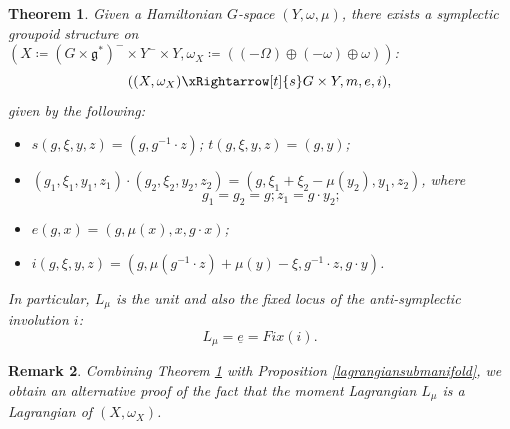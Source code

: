 \documentclass{amsart}
\newtheorem{theorem}{Theorem}[section]
\newtheorem{remark}[theorem]{Remark}
\numberwithin{equation}{section}
\begin{document}
\begin{theorem}\label{twisted-groupoid}
    Given a Hamiltonian $G$-space $(Y, \omega, \mu)$, there exists a symplectic groupoid structure on $(X \coloneqq (G \times \mathfrak{g}^*)^- \times Y^- \times Y, \omega_X \coloneqq ((-\Omega)\oplus (-\omega) \oplus \omega))$:
    $$((X , \omega_X) \xRightarrow[t]{s} G \times Y, m, e, i),$$
given by the following:
    \begin{itemize}
        \item  $s(g, \xi, y, z) = (g, g^{-1}\cdot z)$; $t(g, \xi, y, z) = (g, y)$;
        \item $(g_1, \xi_1, y_1, z_1) \cdot (g_2, \xi_2, y_2, z_2) = (g, \xi_1 + \xi_2 - \mu(y_2), y_1, z_2)$, where 
        $$g_1 = g_2 = g; z_1 = g\cdot y_2;$$
        \item $e(g, x) = (g, \mu(x), x, g\cdot x)$;
        \item $i(g, \xi, y, z) = (g, \mu(g^{-1}\cdot z)+ \mu(y) - \xi, g^{-1}\cdot z, g\cdot y)$.
    \end{itemize}

     In particular, $L_\mu$ is the unit and also the fixed locus of the anti-symplectic involution $i$:
    $$L_\mu = \underline{e} = Fix(i).$$
\end{theorem}



\begin{remark}
Combining Theorem \ref{twisted-groupoid} with Proposition \ref{lagrangiansubmanifold}, we obtain an alternative proof of the fact that the moment Lagrangian $L_\mu$ is a Lagrangian of $(X, \omega_X)$.
\end{remark}
\end{document}
